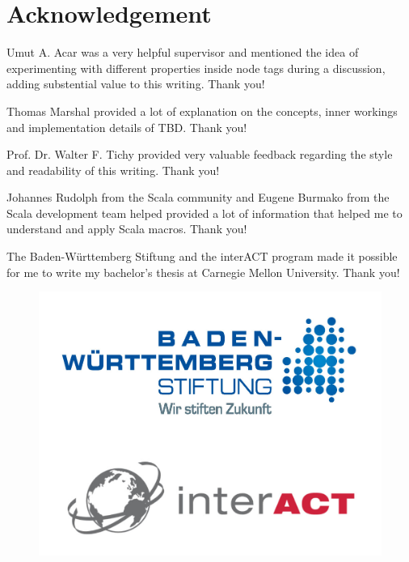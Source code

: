 \documentclass{thesisclass}
\begin{document}

\frontmatter
{}



\chapter*{Acknowledgement}

Umut A. Acar was a very helpful supervisor and mentioned the idea of experimenting with different properties inside node tags during a discussion, adding substential value to this writing. Thank you!

Thomas Marshal provided a lot of explanation on the concepts, inner workings and implementation details of TBD. Thank you!

Prof. Dr. Walter F. Tichy provided very valuable feedback regarding the style and readability of this writing. Thank you!

Johannes Rudolph from the Scala community and Eugene Burmako from the Scala development team helped provided a lot of information that helped me to understand and apply Scala macros. Thank you!

The Baden-W\"urttemberg Stiftung and the interACT program made it possible for me to write my bachelor's thesis at Carnegie Mellon University. Thank you!

\begin{figure}
\centering
\includegraphics[scale=2]{logos/BW.jpg}
\end{figure}
\end{document}
